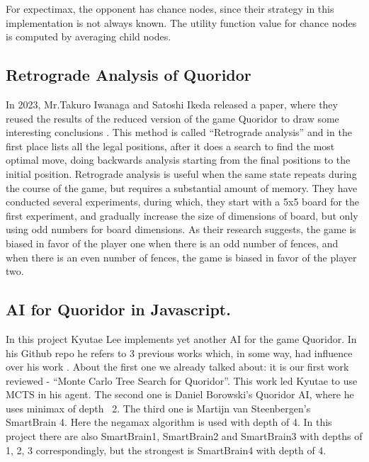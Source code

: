 \documentclass{article}
\begin{document}
For expectimax, the opponent has chance nodes, since their strategy in this implementation is not always known. The utility function value for chance nodes is computed by averaging child nodes. 

\subsection{Retrograde Analysis of Quoridor} \indent

In 2023, Mr.Takuro Iwanaga and Satoshi Ikeda released a paper, where they reused the results of the reduced version of the game Quoridor to draw some interesting conclusions \cite{retrograde}. This method is called “Retrograde analysis” and in the first place lists all the legal positions, after it does a search to find the most optimal move, doing backwards analysis starting from the final positions to the initial position. Retrograde analysis is useful when the same state repeats during the course of the game, but requires a substantial amount of memory. They have conducted several experiments, during which, they start with a 5x5 board for the first experiment, and gradually increase the size of dimensions of board, but only using odd numbers for board dimensions. As their research suggests, the game is biased in favor of the player one when there is an odd number of fences, and when there is an even number of fences, the game is biased in favor of the player two.

\subsection{AI for Quoridor in Javascript.} \indent

	In this project Kyutae Lee implements yet another AI for the game Quoridor. In his Github repo he refers to 3 previous works which, in some way, had influence over his work \cite{javascript}. About the first one we already talked about: it is our first work reviewed - “Monte Carlo Tree Search for Quoridor”. This work led Kyutae to use MCTS in his agent. The second one is Daniel Borowski's Quoridor AI, where he uses minimax of depth ~2. The third one is Martijn van Steenbergen's SmartBrain 4. Here the negamax algorithm is used with depth of 4. In this project there are also SmartBrain1, SmartBrain2 and SmartBrain3 with depths of 1, 2, 3 correspondingly, but the strongest is SmartBrain4 with depth of 4. 
	
\end{document}
